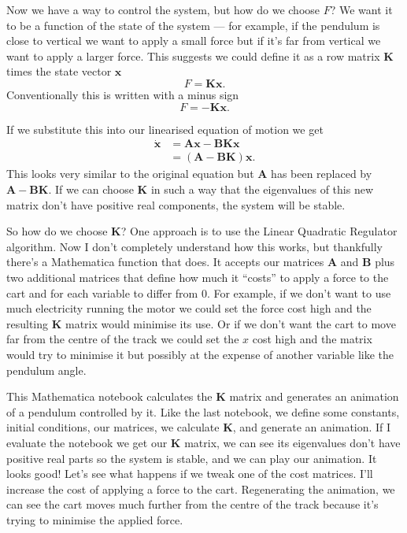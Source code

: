 \documentclass{article}
\renewcommand{\vec}[1]{\boldsymbol{\mathbf{#1}}}
\newcommand{\dvec}[1]{\dot{\vec{#1}}}
\begin{document}
Now we have a way to control the system, but how do we choose $F$? We want it to be a function of the state of the system — for example, if the pendulum is close to vertical we want to apply a small force but if it's far from vertical we want to apply a larger force. This suggests we could define it as a row matrix $\vec{K}$ times the state vector $\vec{x}$ \[F = \vec{K} \vec{x}.\] Conventionally this is written with a minus sign \[F = -\vec{K} \vec{x}.\]

If we substitute this into our linearised equation of motion we get \begin{align*}
  \dvec{x} & = \vec{A} \vec{x} - \vec{B} \vec{K} \vec{x} \\
           & = (\vec{A} - \vec{B} \vec{K}) \vec{x}.
\end{align*} This looks very similar to the original equation but $\vec{A}$ has been replaced by $\vec{A} - \vec{B} \vec{K}$. If we can choose $\vec{K}$ in such a way that the eigenvalues of this new matrix don't have positive real components, the system will be stable.

So how do we choose $\vec{K}$? One approach is to use the Linear Quadratic Regulator algorithm. Now I don't completely understand how this works, but thankfully there's a Mathematica function that does. It accepts our matrices $\vec{A}$ and $\vec{B}$ plus two additional matrices that define how much it ``costs'' to apply a force to the cart and for each variable to differ from $0$. For example, if we don't want to use much electricity running the motor we could set the force cost high and the resulting $\vec{K}$ matrix would minimise its use. Or if we don't want the cart to move far from the centre of the track we could set the $x$ cost high and the matrix would try to minimise it but possibly at the expense of another variable like the pendulum angle.

This Mathematica notebook calculates the $\vec{K}$ matrix and generates an animation of a pendulum controlled by it. Like the last notebook, we define some constants, initial conditions, our matrices, we calculate $\vec{K}$, and generate an animation. If I evaluate the notebook we get our $\vec{K}$ matrix, we can see its eigenvalues don't have positive real parts so the system is stable, and we can play our animation. It looks good! Let's see what happens if we tweak one of the cost matrices. I'll increase the cost of applying a force to the cart. Regenerating the animation, we can see the cart moves much further from the centre of the track because it's trying to minimise the applied force.
\end{document}

